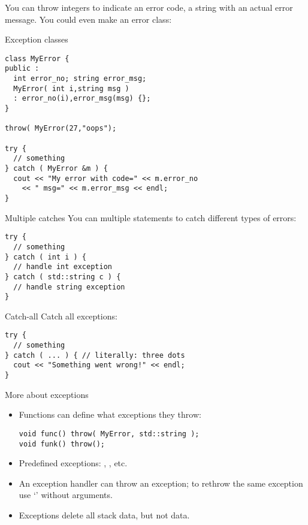 You can throw integers to indicate an error code, a string with an
actual error message. You could even make an error class:

\begin{block}{Exception classes}
  \label{sl:exception-class}
\begin{verbatim}
class MyError {
public :
  int error_no; string error_msg;
  MyError( int i,string msg )
  : error_no(i),error_msg(msg) {};
}

throw( MyError(27,"oops");

try {
  // something
} catch ( MyError &m ) {
  cout << "My error with code=" << m.error_no
    << " msg=" << m.error_msg << endl;
}
\end{verbatim}
\end{block}

\begin{block}{Multiple catches}
  \label{sl:exception-catches}
  You can multiple  statements to catch different types of
  errors:
\begin{verbatim}
try {
  // something
} catch ( int i ) {
  // handle int exception
} catch ( std::string c ) {
  // handle string exception
}
\end{verbatim}
\end{block}

\begin{block}{Catch-all}
  \label{sl:exception-catchall}
  Catch all exceptions:
\begin{verbatim}
try {
  // something
} catch ( ... ) { // literally: three dots
  cout << "Something went wrong!" << endl;
}
\end{verbatim}
\end{block}

\begin{block}{More about exceptions}
  \label{sl:exception-more}
  \begin{itemize}
  \item Functions can define what exceptions they throw: 
\begin{verbatim}
void func() throw( MyError, std::string );
void funk() throw();
\end{verbatim}
\item Predefined exceptions: ,
  , etc.
\item An exception handler can throw an exception; to rethrow the same
  exception use `' without arguments.
\item Exceptions delete all stack data, but not  data.
  \end{itemize}
\end{block}
